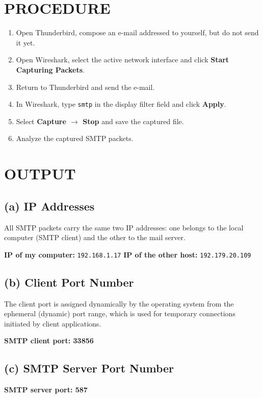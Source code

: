 \documentclass[12pt,a4paper]{article}
\begin{document}
	\section*{PROCEDURE}
	\begin{enumerate}
		\item Open Thunderbird, compose an e-mail addressed to yourself, but do not send it yet.
		\item Open Wireshark, select the active network interface and click \textbf{Start Capturing Packets}.
		\item Return to Thunderbird and send the e-mail.
		\item In Wireshark, type \texttt{smtp} in the display filter field and click \textbf{Apply}.
		\item Select \textbf{Capture $\rightarrow$ Stop} and save the captured file.
		\item Analyze the captured SMTP packets.
	\end{enumerate}
	
	\section*{OUTPUT}
	
	\subsection*{(a) IP Addresses}
	All SMTP packets carry the same two IP addresses: one belongs to the local computer (SMTP client) and the other to the mail server.
	
	\textbf{IP of my computer:} \texttt{192.168.1.17} \hfill \textbf{IP of the other host:} \texttt{192.179.20.109}
	
	
	\subsection*{(b) Client Port Number}
	The client port is assigned dynamically by the operating system from the ephemeral (dynamic) port range, which is used for temporary connections initiated by client applications.
	
	\textbf{SMTP client port: 33856}
	
	
	\subsection*{(c) SMTP Server Port Number}
	
	\textbf{SMTP server port: 587}
	
\end{document}
